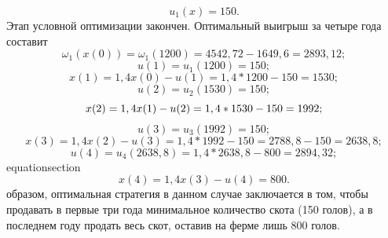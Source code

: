  \begin{equation*}
u_1(x)=150.
\end{equation*}
\indent Этап условной оптимизации закончен. Оптимальный выигрыш за четыре года составит
 \begin{equation*}
\omega_1(x(0))=\omega_1(1200)=4542,72-1649,6=2893,12;
\end{equation*}
\begin{equation*}
u(1)=u_1(1200)=150;
\end{equation*}
\begin{equation*}
x(1)=1,4x(0)-u(1)=1,4*1200-150=1530;
\end{equation*}
 \begin{equation*}
u(2)=u_2(1530)=150;
\end{equation*}
 \begin{equation*}\setlength\parsep{-20pt}
x(2)=1,4x(1)-u(2)=1,4*1530-150=1992;
\end{equation*}
 \begin{equation*}
u(3)=u_3(1992)=150;
\end{equation*}
 \begin{equation*}
x(3)=1,4x(2)-u(3)=1,4*1992-150=2788,8-150=2638,8;
\end{equation*}
 \begin{equation*}
u(4)=u_4(2638,8)=1,4*2638,8-800=2894,32;
\end{equation*}
\numberwithin
{equation}{section}\begin{equation*}x(4) = 1,4x(3)-u(4) = 800.\end{equation*}
 образом, оптимальная стратегия в данном случае заключается в том, чтобы продавать в первые три года минимальное количество скота (150 голов), а в последнем году продать весь скот, оставив на ферме лишь 800 голов.

